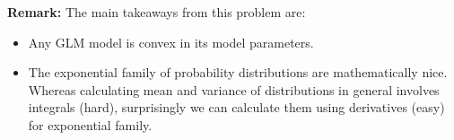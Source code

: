 \textbf{Remark:} The main takeaways from this problem are:
\begin{itemize}
  \item Any GLM model is convex in its model parameters.
  \item The exponential family of probability distributions are mathematically
  nice. Whereas calculating mean and variance of distributions in general
  involves integrals (hard), surprisingly we can calculate them using
  derivatives (easy) for exponential family.
\end{itemize}
